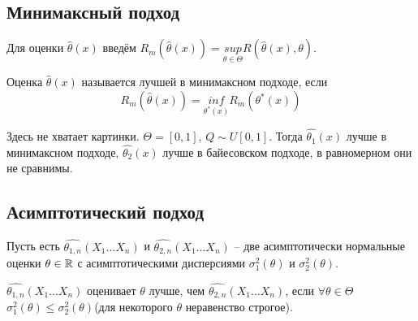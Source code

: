 \subsection{Минимаксный подход}
Для оценки $\hat{\theta}(x)$ введём $R_m(\hat{\theta}(x)) = \underset{\theta \in \Theta}{sup}R(\hat{\theta}(x), \theta)$. 
\begin{definition}
Оценка $\hat{\theta}(x)$ называется лучшей в минимаксном подходе, если
$$
R_m(\hat{\theta}(x)) = \underset{\theta^{*}(x)}{inf}R_m(\theta^{*}(x))
$$
\end{definition}

\begin{example}
Здесь не хватает картинки.
$\Theta = [0,1]$, $Q \sim U[0,1]$. Тогда $\hat{\theta_1}(x)$ лучше в минимаксном подходе, $\hat{\theta_2}(x)$ лучше в байесовском подходе, в равномерном они не сравнимы.
\end{example}

\subsection{Асимптотический подход}
Пусть есть $\hat{\theta_{1, n}}(X_1 \ldots X_n)$ и $\hat{\theta_{2, n}}(X_1 \ldots X_n)$ -- две асимптотически нормальные оценки $\theta \in \mathbb{R}$ с асимптотическими дисперсиями $\sigma^{2}_1(\theta)$ и $\sigma^{2}_2(\theta)$.
\begin{definition}
$\hat{\theta_{1, n}}(X_1 \ldots X_n)$ оценивает $\theta$ лучше, чем $\hat{\theta_{2, n}}(X_1 \ldots X_n)$, если $\forall \theta \in \Theta$ $\sigma^{2}_1(\theta) \le \sigma^{2}_2(\theta)$(для некоторого $\theta$ неравенство строгое).
\end{definition}

